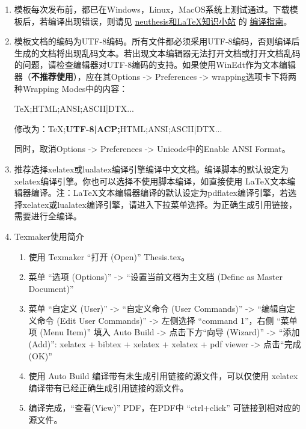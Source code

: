 \begin{enumerate}
    \item 模板每次发布前，都已在Windows，Linux，MacOS系统上测试通过。下载模板后，若编译出现错误，则请见 \href{https://github.com/mervin0502/neuthesis/wiki}{neuthesis和LaTeX知识小站} 的 \href{https://github.com/mervin0502/neuthesis/wiki/%E7%BC%96%E8%AF%91%E6%8C%87%E5%8D%97}{编译指南}。

    \item 模板文档的编码为UTF-8编码。所有文件都必须采用UTF-8编码，否则编译后生成的文档将出现乱码文本。若出现文本编辑器无法打开文档或打开文档乱码的问题，请检查编辑器对UTF-8编码的支持。如果使用WinEdt作为文本编辑器（\textbf{不推荐使用}），应在其Options -> Preferences -> wrapping选项卡下将两种Wrapping Modes中的内容：
        
        TeX;HTML;ANSI;ASCII|DTX...
        
        修改为：TeX;\textbf{UTF-8|ACP;}HTML;ANSI;ASCII|DTX...
        
        同时，取消Options -> Preferences -> Unicode中的Enable ANSI Format。

    \item 推荐选择xelatex或lualatex编译引擎编译中文文档。编译脚本的默认设定为xelatex编译引擎。你也可以选择不使用脚本编译，如直接使用 LaTeX文本编辑器编译。注：LaTeX文本编辑器编译的默认设定为pdflatex编译引擎，若选择xelatex或lualatex编译引擎，请进入下拉菜单选择。为正确生成引用链接，需要进行全编译。

    \item Texmaker使用简介
        \begin{enumerate}
            \footnotesize
            \item 使用 Texmaker “打开 (Open)” Thesis.tex。
            \item 菜单 “选项 (Options)” -> “设置当前文档为主文档 (Define as Master Document)”
            \item 菜单 “自定义 (User)” -> “自定义命令 (User Commands)” -> “编辑自定义命令 (Edit User Commands)” -> 左侧选择 “command 1”，右侧 “菜单项 (Menu Item)” 填入 Auto Build -> 点击下方“向导 (Wizard)” -> “添加 (Add)”: xelatex + bibtex + xelatex + xelatex + pdf viewer -> 点击“完成 (OK)”
            \item 使用 Auto Build 编译带有未生成引用链接的源文件，可以仅使用 xelatex 编译带有已经正确生成引用链接的源文件。
            \item 编译完成，“查看(View)” PDF，在PDF中 “ctrl+click” 可链接到相对应的源文件。
        \end{enumerate}
    

\end{enumerate}
